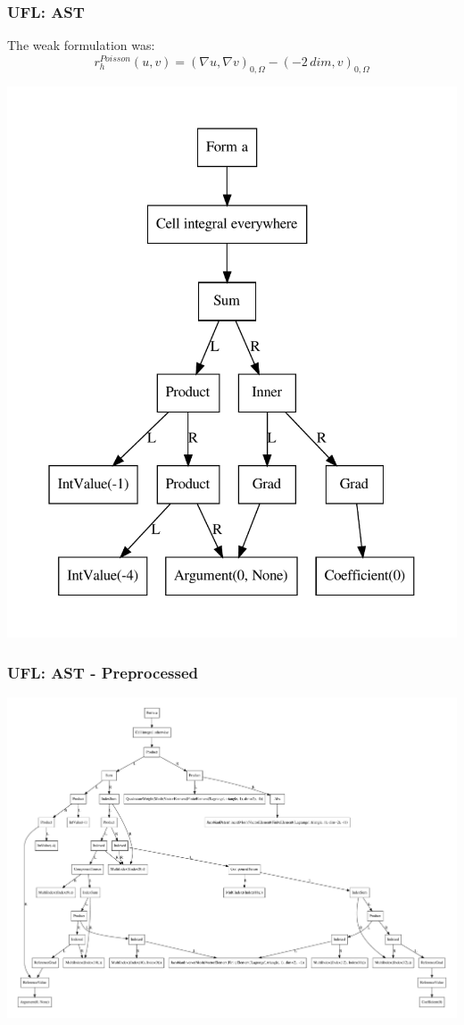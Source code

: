 \documentclass[aspectratio=169,11pt]{beamer}
\theoremstyle{definition}
\begin{document}
\begin{frame}
  \frametitle{UFL: AST}
  \begin{minipage}{0.6\textwidth}
    The weak formulation was:
    \begin{equation*}
      r_h^{Poisson}(u,v) = (\nabla u, \nabla v)_{0,\Omega} - (-2\, dim, v)_{0,\Omega}
    \end{equation*}
  \end{minipage}%
  \begin{minipage}{0.3\textwidth}
       \includegraphics[scale=0.4]{figures/ufl_ast.pdf}
  \end{minipage}
\end{frame}

\begin{frame}
  \frametitle{UFL: AST - Preprocessed}
  \centering
  \includegraphics[scale=0.18]{figures/ufl_ast_preprocessed.pdf}
\end{frame}
\end{document}
